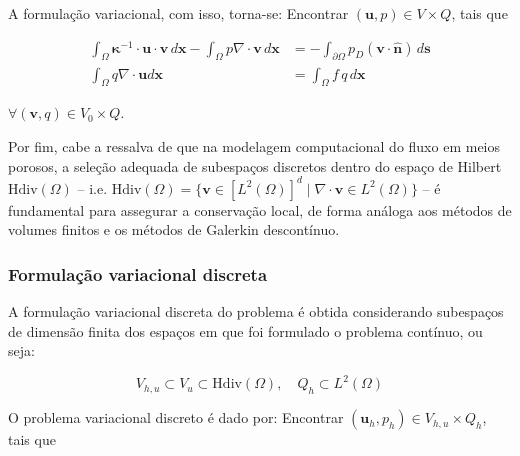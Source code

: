 A formulação variacional, com isso, torna-se: Encontrar $(\mathbf{u},p) \in V \times Q$, tais que

\begin{equation}
	\begin{aligned}
		\int_{\Omega}\boldsymbol{\kappa}^{-1} \cdot \mathbf{u} \cdot \mathbf{v} \, d\mathbf{x}  - \int_{\Omega}p\nabla \cdot \mathbf{v} \, d\mathbf{x} &= -\int_{\partial \Omega}p_D \left (\mathbf{v} \cdot \hat{\mathbf{n}}\right ) \, d\mathbf{s} \\
		\int_{\Omega} q \nabla \cdot \mathbf{u} d\mathbf{x} &= \int_{\Omega} f \, q \,d\mathbf{x}
	\end{aligned}
\end{equation}

$\forall (\mathbf{v},q) \in V_0 \times Q$.

Por fim, cabe a ressalva de que na modelagem computacional do fluxo em meios porosos, a seleção adequada de subespaços discretos dentro do espaço de Hilbert $\text{Hdiv}(\Omega)$ -- i.e. $\text{Hdiv}(\Omega) = \{\mathbf{v} \in [L^{2}(\Omega)]^{d} \mid \nabla \cdot \mathbf{v} \in L^{2}(\Omega)\}$ -- é fundamental para assegurar a conservação local, de forma análoga aos métodos de volumes finitos e os métodos de Galerkin descontínuo.

\subsubsection{Formulação variacional discreta}

A formulação variacional discreta do problema é obtida considerando subespaços de dimensão finita dos espaços em que foi formulado o problema contínuo, ou seja:

\begin{equation}
	V_{h,u} \subset V_u \subset \text{Hdiv}(\Omega), \quad Q_h \subset L^2(\Omega)
\end{equation}

O problema variacional discreto é dado por: Encontrar \((\mathbf{u}_h , p_h) \in V_{h,u} \times Q_h\), tais que

